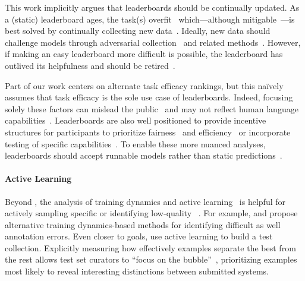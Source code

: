 This work implicitly argues that leaderboards should be
continually updated.  As a (static) leaderboard ages, the task(s)
overfit~\citep{recht2019generalize} which---although
mitigable~\citep{blum2015ladder,andersonCook2019host}---is best solved
by continually collecting new data~\citep{kiela2021dynabench}.
%
Ideally, new data should challenge models through adversarial
collection~\citep{wallace2018trick,nie2019adversarial} and related
methods~\citep{Gardner2020-gn}.  However, if making an easy
leaderboard more difficult is possible, the
leaderboard has outlived its helpfulness and should be retired~\citep{voorhees1999trec8}.

Part of our work centers on alternate task efficacy rankings, but this
na\"ively assumes that task efficacy is the sole use case of
leaderboards.
%
Indeed, focusing solely these factors can mislead the
public~\citep{paullada2020data} and may not reflect human language
capabilities~\citep{schlangen2020targeting}.
%
Leaderboards are also well positioned to provide incentive structures
for participants to prioritize fairness~\citep{bender2018data} and
efficiency~\citep{strubell2019energy,schwartz2020green,min2021efficientqa}
or incorporate testing of specific
capabilities~\citep{ribeiro2020checklist,Dunietz2020-ty}.
%
To enable these more nuanced analyses, leaderboards should accept
runnable models rather than static
predictions~\citep{ma2021dynaboard}.

\paragraph{\textbf{Active Learning}}
Beyond \irt{}, the analysis of training dynamics and active learning~\citep{settles09active} is helpful for actively sampling specific \itms{} or identifying low-quality \itms{}~\citep{brodley1999mislabel}.
For example, \citet{swayamdipta2020cartography} and \citet{pleiss2020aum} propose alternative training dynamics-based methods for identifying difficult \itms{} as well annotation errors.
Even closer to goals, \citet{rahman2020active} use active learning to build a test collection.
%
Explicitly measuring how effectively examples separate the best \subj{} from the rest allows test set curators to ``focus on the bubble''~\citep{boydgraber2020nerds}, prioritizing examples most likely to reveal interesting distinctions between submitted systems.
%

